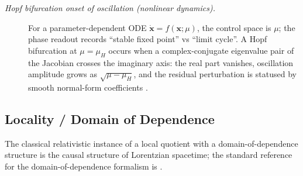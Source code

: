 \documentclass[11pt]{article}
\theoremstyle{definition}
\begin{document}
\begin{description}
\item[\emph{Hopf bifurcation onset of oscillation
(nonlinear dynamics).}]
For a parameter-dependent ODE
\(\dot{\mathbf x}=f(\mathbf x;\mu)\), the control
space is \(\mu\); the phase readout records ``stable
fixed point'' vs ``limit cycle''.  A Hopf bifurcation
at \(\mu=\mu_H\) occurs when a complex-conjugate
eigenvalue pair of the Jacobian crosses the
imaginary axis: the real part vanishes, oscillation
amplitude grows as \(\sqrt{\mu-\mu_H}\), and the
residual perturbation is statused by smooth
normal-form coefficients \citep{Hopf1942Abzweigung}.
\end{description}

\subsection{Locality / Domain of Dependence}\label{sec:self-reference-limits:locality}

The classical relativistic instance of a local quotient with a
domain-of-dependence structure is the causal structure of
Lorentzian spacetime; the standard reference for the
domain-of-dependence formalism is \citet[Chapter~8]{Wald1984GR}.
\end{document}
